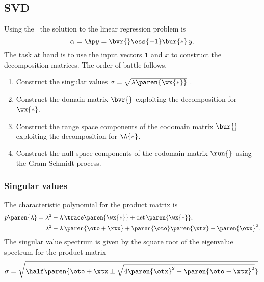 \subsection{SVD}
Using the \asvd \ the solution to the linear regression problem is
  \begin{equation}
    \alpha = \Ap y = \bvr{} \ess{-1} \bur{*}\, y.
  \end{equation}
The task at hand is to use the input vectors $\mathbf{1}$ and $x$ to construct the decomposition matrices. The order of battle follows.
\begin{enumerate}
\item Construct the singular values $\sigma{} = \sqrt{\lambda\paren{\wx{*}}}$ .
\item Construct the domain matrix   $\bvr{}$ exploiting the decomposition for $\wx{*}$.
\item Construct the range space components of the codomain matrix $\bur{}$ exploiting the decomposition for $\A{*}$.
\item Construct the null space components of the codomain matrix $\run{}$ using the Gram-Schmidt process.
\end{enumerate}

\subsubsection{Singular values}
The characteristic polynomial for the product matrix is
  \begin{equation}
  \begin{split}
    p \paren{\lambda} 
      &= \lambda^{2} - \lambda \, \trace \paren{\wx{*}} + \det \paren{\wx{*}}, \\
      &= \lambda^{2} - \lambda \, \paren{\oto + \xtx}   + \paren{\oto} \paren{\xtx} - \paren{\otx}^{2} .
  \end{split}
  \end{equation}
The singular value spectrum is given by the square root of the eigenvalue spectrum for the product matrix
  \begin{equation}
    \sigma = \sqrt{\half \paren{\oto+\xtx \pm \sqrt{4\paren{\otx}^{2} - \paren{\oto-\xtx}^{2}}}} .
  \end{equation}


